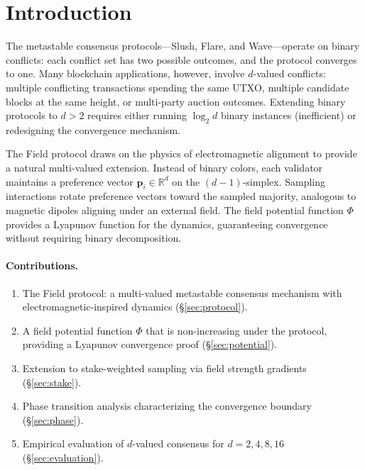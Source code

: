 \section{Introduction}

\label{sec:introduction}

The metastable consensus protocols---Slush, Flare, and Wave---operate on binary conflicts:
each conflict set has two possible outcomes, and the protocol converges to one. Many
blockchain applications, however, involve $d$-valued conflicts: multiple conflicting
transactions spending the same UTXO, multiple candidate blocks at the same height, or
multi-party auction outcomes. Extending binary protocols to $d > 2$ requires either
running $\log_2 d$ binary instances (inefficient) or redesigning the convergence mechanism.

The Field protocol draws on the physics of electromagnetic alignment to provide a natural
multi-valued extension. Instead of binary colors, each validator maintains a preference
vector $\mathbf{p}_i \in \mathbb{R}^d$ on the $(d-1)$-simplex. Sampling interactions
rotate preference vectors toward the sampled majority, analogous to magnetic dipoles
aligning under an external field. The field potential function $\Phi$ provides a
Lyapunov function for the dynamics, guaranteeing convergence without requiring
binary decomposition.

\paragraph{Contributions.}
\begin{enumerate}[nosep]
\item The Field protocol: a multi-valued metastable consensus mechanism with
electromagnetic-inspired dynamics (\S\ref{sec:protocol}).
\item A field potential function $\Phi$ that is non-increasing under the protocol,
providing a Lyapunov convergence proof (\S\ref{sec:potential}).
\item Extension to stake-weighted sampling via field strength gradients (\S\ref{sec:stake}).
\item Phase transition analysis characterizing the convergence boundary (\S\ref{sec:phase}).
\item Empirical evaluation of $d$-valued consensus for $d = 2, 4, 8, 16$ (\S\ref{sec:evaluation}).
\end{enumerate}

